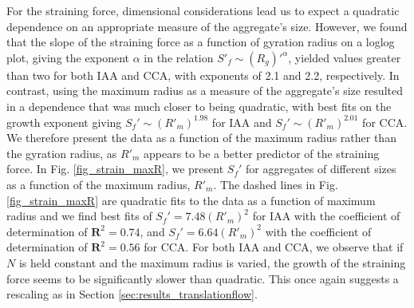 For the straining force, dimensional considerations lead us to expect a quadratic dependence on an appropriate measure of the aggregate's size. However, we found  that the slope of the straining force as a function of gyration radius on a loglog plot, giving the exponent $\alpha$ in the relation $S'_f \sim (R_g)'^{\alpha}$, yielded values greater than two for both IAA and CCA, with exponents of 2.1 and 2.2, respectively. In contrast, using the maximum radius as a measure of the aggregate's size resulted in a dependence that was much closer to being quadratic, with best fits on the growth exponent giving $S_f' \sim (R'_m)^{1.98}$ for IAA and $S_f' \sim (R'_m)^{2.01}$ for CCA. 
We therefore present the data as a function of the maximum radius rather than the gyration radius, as $R'_m$ appears to be a better predictor of the straining force.
In Fig. \ref{fig_strain_maxR}, we present $S_f'$ for aggregates 
of different sizes as a function of the maximum 
radius, $R'_m$. 
The dashed lines in  Fig. \ref{fig_strain_maxR}  are quadratic fits to the data as a function of maximum radius and we find best fits of $S_f' = 7.48 (R'_m)^2$ for IAA with the coefficient of determination of $\mathbf{R}^2=0.74$, and $S_f' = 6.64 (R'_m)^2$ with the coefficient of determination of $\mathbf{R}^2=0.56$ for CCA. For both IAA and CCA, we observe that if $N$ is held constant and the maximum radius is varied, the growth of the straining force seems to be significantly slower than quadratic. This once again suggests a rescaling as in Section \ref{sec:results_translationflow}. 

